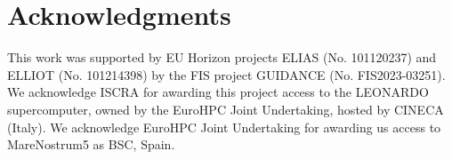 \section*{Acknowledgments}
This work was supported by EU Horizon projects ELIAS (No. 101120237) and ELLIOT (No. 101214398) by the FIS project GUIDANCE (No. FIS2023-03251).
We acknowledge ISCRA for awarding this project access to the LEONARDO supercomputer, owned by the EuroHPC Joint Undertaking, hosted by CINECA (Italy). We acknowledge EuroHPC Joint Undertaking for awarding us access to MareNostrum5 as BSC, Spain.


